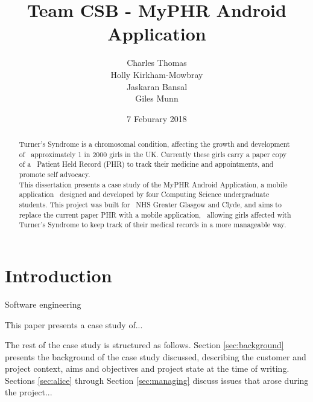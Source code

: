 \documentclass{l3proj}
\begin{document}
\title{Team CSB - MyPHR Android Application}

\author{Charles Thomas \\
        Holly Kirkham-Mowbray \\
        Jaskaran Bansal \\
        Giles Munn}

\date{7 Feburary 2018}

\maketitle

\begin{abstract}

Turner's Syndrome is a chromosomal condition, affecting the growth and development of \
approximately 1 in 2000 girls in the UK. Currently these girls carry a paper copy of a \
Patient Held Record (PHR) to track their medicine and appointments, and promote self advocacy. \\
This dissertation presents a case study of the MyPHR Android Application, a mobile application \
designed and developed by four Computing Science undergraduate students. This project was built for \
NHS Greater Glasgow and Clyde, and aims to replace the current paper PHR with a mobile application, \
allowing girls affected with Turner's Syndrome to keep track of their medical records in a more manageable way.

\end{abstract}

\educationalconsent

\newpage

\section{Introduction}

Software engineering 

This paper presents a case study of... 


The rest of the case study is structured as follows.  Section
\ref{sec:background} presents the background of the case study
discussed, describing the customer and project context, aims and
objectives and project state at the time of writing.  Sections
\ref{sec:alice} through Section \ref{sec:managing} discuss issues that
arose during the project...
\end{document}
